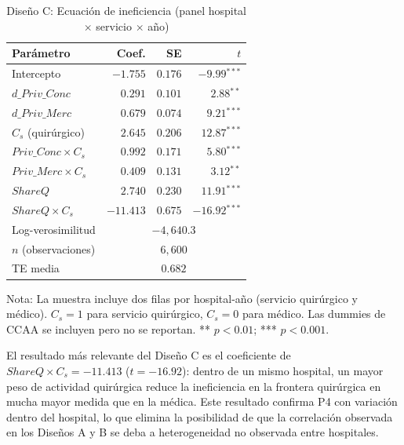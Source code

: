 \documentclass[12pt, a4paper]{article}
\newcommand{\sig}[1]{\ensuremath{^{#1}}}
\begin{document}
\begin{table}[h!]
\centering
\caption{Diseño C: Ecuación de ineficiencia
(panel hospital $\times$ servicio $\times$ año)}
\label{tab:disC}
\begin{threeparttable}
\begin{tabular}{lrrr}
\toprule
\textbf{Parámetro} & \textbf{Coef.} & \textbf{SE} &
\textbf{$t$} \\
\midrule
Intercepto & $-1.755$ & $0.176$ & $-9.99$\sig{***} \\
$d\_Priv\_Conc$ & $0.291$ & $0.101$ & $2.88$\sig{**} \\
$d\_Priv\_Merc$ & $0.679$ & $0.074$ & $9.21$\sig{***} \\
$C_s$ (quirúrgico) & $2.645$ & $0.206$ & $12.87$\sig{***} \\
$Priv\_Conc \times C_s$ & $0.992$ & $0.171$ & $5.80$\sig{***} \\
$Priv\_Merc \times C_s$ & $0.409$ & $0.131$ & $3.12$\sig{**} \\
$ShareQ$ & $2.740$ & $0.230$ & $11.91$\sig{***} \\
$ShareQ \times C_s$ & $-11.413$ & $0.675$ & $-16.92$\sig{***} \\
\midrule
Log-verosimilitud & \multicolumn{3}{c}{$-4{,}640.3$} \\
$n$ (observaciones) & \multicolumn{3}{c}{$6{,}600$} \\
TE media & \multicolumn{3}{c}{$0.682$} \\
\bottomrule
\end{tabular}
\begin{tablenotes}
  \small
  \item Nota: La muestra incluye dos filas por
    hospital-año (servicio quirúrgico y médico).
    $C_s = 1$ para servicio quirúrgico, $C_s = 0$
    para médico. Las dummies de CCAA se incluyen pero
    no se reportan. ** $p<0.01$; *** $p<0.001$.
\end{tablenotes}
\end{threeparttable}
\end{table}

El resultado más relevante del Diseño C es el
coeficiente de $ShareQ \times C_s = -11.413$
($t=-16.92$): dentro de un mismo hospital, un mayor
peso de actividad quirúrgica reduce la ineficiencia
en la frontera quirúrgica en mucha mayor medida que
en la médica. Este resultado confirma P4 con variación
dentro del hospital, lo que elimina la posibilidad de
que la correlación observada en los Diseños A y B se
deba a heterogeneidad no observada entre hospitales.
\end{document}

